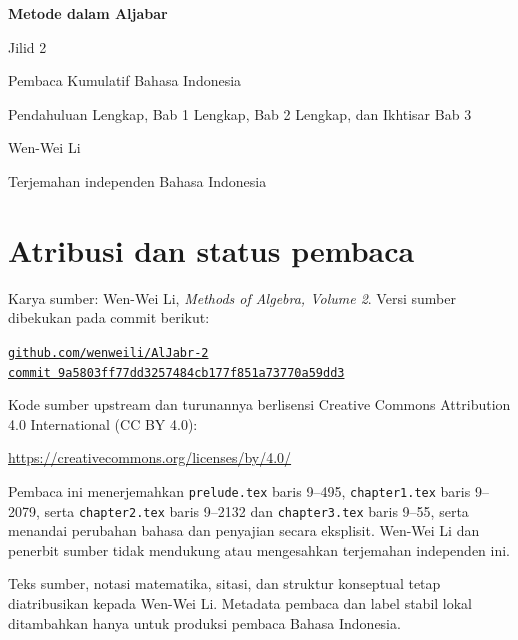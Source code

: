 \documentclass[
  colors=true,
  fontsetup=font-setup-id.tex,
  titlesetup=titles-setup.tex
]{AJbook2}
\theoremstyle{plain}
\theoremstyle{nonumberplain}
\numberwithin{equation}{section}
\numberwithin{figure}{section}
\begin{document}
\begin{titlepage}
  \centering
  \vspace*{0.16\textheight}
  {\Huge\bfseries Metode dalam Aljabar\par}
  \vspace{0.8em}
  {\LARGE Jilid 2\par}
  \vspace{1.8em}
  {\Large Pembaca Kumulatif Bahasa Indonesia\par}
  \vspace{0.6em}
  {\large Pendahuluan Lengkap, Bab 1 Lengkap, Bab 2 Lengkap, dan Ikhtisar Bab 3\par}
  \vfill
  {\Large Wen-Wei Li\par}
  \vspace{0.6em}
  {\normalsize Terjemahan independen Bahasa Indonesia\par}
  \vspace*{0.10\textheight}
\end{titlepage}

\cleardoublepage
\thispagestyle{empty}
\section*{Atribusi dan status pembaca}
Karya sumber: Wen-Wei Li, \emph{Methods of Algebra, Volume 2}. Versi
sumber dibekukan pada commit berikut:
\begin{center}
  \small
  \href{https://github.com/wenweili/AlJabr-2}{\texttt{github.com/wenweili/AlJabr-2}}\\
  \href{https://github.com/wenweili/AlJabr-2/commit/9a5803ff77dd3257484cb177f851a73770a59dd3}{\texttt{commit 9a5803ff77dd3257484cb177f851a73770a59dd3}}
\end{center}
Kode sumber upstream dan turunannya berlisensi Creative Commons
Attribution 4.0 International (CC BY 4.0):
\begin{center}
  \small\url{https://creativecommons.org/licenses/by/4.0/}
\end{center}
Pembaca ini menerjemahkan
\texttt{prelude.tex} baris 9--495, \texttt{chapter1.tex} baris 9--2079,
serta \texttt{chapter2.tex} baris 9--2132 dan \texttt{chapter3.tex} baris
9--55, serta menandai perubahan bahasa dan penyajian secara eksplisit. Wen-Wei Li dan penerbit sumber tidak
mendukung atau mengesahkan terjemahan independen ini.

\medskip
Teks sumber, notasi matematika, sitasi, dan struktur konseptual tetap
diatribusikan kepada Wen-Wei Li. Metadata pembaca dan label stabil lokal
ditambahkan hanya untuk produksi pembaca Bahasa Indonesia.
\end{document}
